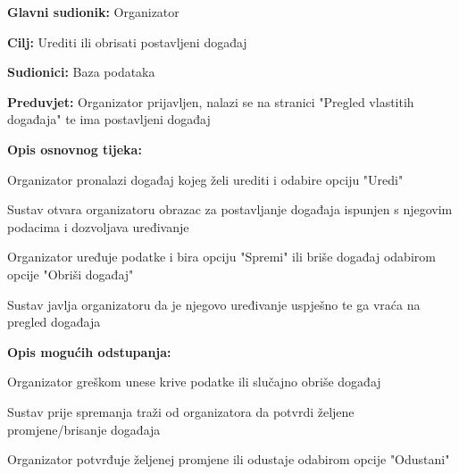 					\noindent {}
\begin{packed_item}
	\item \textbf{Glavni sudionik:} Organizator
	\item  \textbf{Cilj:} Urediti ili obrisati postavljeni događaj
	\item  \textbf{Sudionici:} Baza podataka
	\item  \textbf{Preduvjet:} Organizator prijavljen, nalazi se na stranici "Pregled vlastitih događaja" te ima postavljeni događaj
	\item  \textbf{Opis osnovnog tijeka:}
	
	\item[] \begin{packed_enum}
		
		\item Organizator pronalazi događaj kojeg želi urediti i odabire opciju "Uredi"
		\item Sustav otvara organizatoru obrazac za postavljanje događaja ispunjen s njegovim podacima i dozvoljava uređivanje
		\item Organizator uređuje podatke i bira opciju "Spremi" ili briše događaj odabirom opcije "Obriši događaj"
		\item Sustav javlja organizatoru da je njegovo uređivanje uspješno te ga vraća na pregled događaja
	\end{packed_enum}
	
	\item  \textbf{Opis mogućih odstupanja:}
	
	\item[] \begin{packed_item}
		
		\item[3.a] Organizator greškom unese krive podatke ili slučajno obriše događaj
		\item[] \begin{packed_enum}
			
			\item Sustav prije spremanja traži od organizatora da potvrdi željene promjene/brisanje događaja
			\item Organizator potvrđuje željenej promjene ili odustaje odabirom opcije "Odustani"
			
		\end{packed_enum}
	\end{packed_item}
\end{packed_item}


